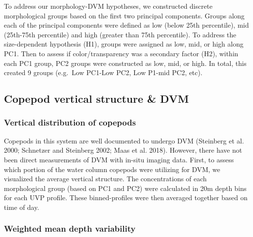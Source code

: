 \documentclass[
  letterpaper,
  DIV=11,
  numbers=noendperiod]{scrartcl}
\begin{document}
To address our morphology-DVM hypotheses, we constructed discrete
morphological groups based on the first two principal components. Groups
along each of the principal components were defined as low (below 25th
percentile), mid (25th-75th percentile) and high (greater than 75th
percentile). To address the size-dependent hypothesis (H1), groups were
assigned as low, mid, or high along PC1. Then to assess if
color/transparency was a secondary factor (H2), within each PC1 group,
PC2 groups were constructed as low, mid, or high. In total, this created
9 groups (e.g.~Low PC1-Low PC2, Low P1-mid PC2, etc).

\hypertarget{copepod-vertical-structure-dvm}{%
\subsection{Copepod vertical structure \&
DVM}\label{copepod-vertical-structure-dvm}}

\hypertarget{vertical-distribution-of-copepods}{%
\subsubsection{Vertical distribution of
copepods}\label{vertical-distribution-of-copepods}}

Copepods in this system are well documented to undergo DVM (Steinberg et
al. 2000; Schnetzer and Steinberg 2002; Maas et al. 2018). However,
there have not been direct measurements of DVM with in-situ imaging
data. First, to assess which portion of the water column copepods were
utilizing for DVM, we visualized the average vertical structure. The
concentrations of each morphological group (based on PC1 and PC2) were
calculated in 20m depth bins for each UVP profile. These binned-profiles
were then averaged together based on time of day.

\hypertarget{weighted-mean-depth-variability}{%
\subsubsection{Weighted mean depth
variability}\label{weighted-mean-depth-variability}}
\end{document}
